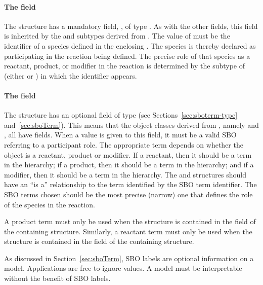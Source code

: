 \paragraph{The  field}

The \SimpleSpeciesReference structure has a mandatory field,
, of type .  As with the other
fields, this field is inherited by the \SpeciesReference and
\ModifierSpeciesReference subtypes derived from
\SimpleSpeciesReference.  The value of  must be the
identifier of a species defined in the enclosing \Model.  The
species is thereby declared as participating in the reaction being
defined.  The precise role of that species as a reactant, product,
or modifier in the reaction is determined by the subtype of
\SimpleSpeciesReference (\ie either \SpeciesReference or
\ModifierSpeciesReference) in which the identifier appears.


\paragraph{The  field}

The \SimpleSpeciesReference structure has an optional
 field of type  (see
Sections~\ref{sec:sboterm-type} and~\ref{sec:sboTerm}).  This
means that the object classes derived from
\SimpleSpeciesReference, namely \SpeciesReference and
\ModifierSpeciesReference, all have  fields.  When
a value is given to this field, it must be a valid SBO referring
to a participant role.  The appropriate term depends on whether
the object is a reactant, product or modifier.  If a reactant,
then it should be a term in the \sboreactant hierarchy; if a
product, then it should be a term in the \sboproduct hierarchy;
and if a modifier, then it should be a term in the \sbomodifier
hierarchy. The \SpeciesReference and \ModifierSpeciesReference
structures should have an ``is a'' relationship to the term
identified by the SBO term identifier.  The SBO terms chosen
should be the most precise (narrow) one that defines the role of
the species in the reaction.

A product term must only be used when the \SpeciesReference
structure is contained in the  field of the
containing \Reaction structure.  Similarly, a reactant term must
only be used when the \SpeciesReference structure is contained in
the  field of the containing \Reaction structure.

As discussed in Section~\ref{sec:sboTerm}, SBO labels are optional
information on a model.  Applications are free to ignore
 values.  A model must be interpretable without the
benefit of SBO labels.


